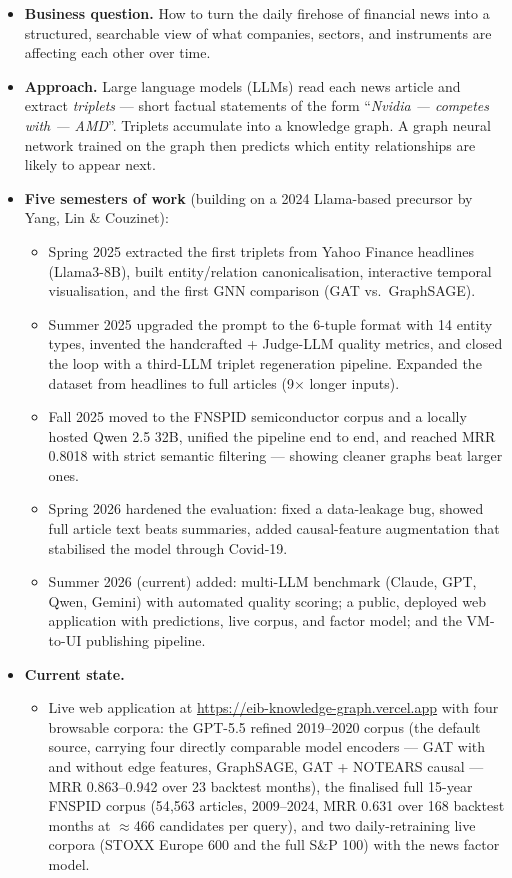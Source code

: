 \documentclass[11pt]{article}
\begin{document}
\begin{itemize}
  \item \textbf{Business question.} How to turn the daily firehose of financial news into a structured, searchable view of what companies, sectors, and instruments are affecting each other over time.
  \item \textbf{Approach.} Large language models (LLMs) read each news article and extract \emph{triplets} --- short factual statements of the form ``\textit{Nvidia --- competes with --- AMD}''. Triplets accumulate into a knowledge graph. A graph neural network trained on the graph then predicts which entity relationships are likely to appear next.
  \item \textbf{Five semesters of work} (building on a 2024 Llama-based precursor by Yang, Lin \& Couzinet):
    \begin{itemize}
      \item Spring 2025 extracted the first triplets from Yahoo Finance headlines (Llama3-8B), built entity/relation canonicalisation, interactive temporal visualisation, and the first GNN comparison (GAT vs.\ GraphSAGE).
      \item Summer 2025 upgraded the prompt to the 6-tuple format with 14 entity types, invented the handcrafted + Judge-LLM quality metrics, and closed the loop with a third-LLM triplet regeneration pipeline. Expanded the dataset from headlines to full articles (9\(\times\) longer inputs).
      \item Fall 2025 moved to the FNSPID semiconductor corpus and a locally hosted Qwen 2.5 32B, unified the pipeline end to end, and reached MRR 0.8018 with strict semantic filtering --- showing cleaner graphs beat larger ones.
      \item Spring 2026 hardened the evaluation: fixed a data-leakage bug, showed full article text beats summaries, added causal-feature augmentation that stabilised the model through Covid-19.
      \item Summer 2026 (current) added: multi-LLM benchmark (Claude, GPT, Qwen, Gemini) with automated quality scoring; a public, deployed web application with predictions, live corpus, and factor model; and the VM-to-UI publishing pipeline.
    \end{itemize}
  \item \textbf{Current state.}
    \begin{itemize}
      \item Live web application at \url{https://eib-knowledge-graph.vercel.app} with four browsable corpora: the GPT-5.5 refined 2019--2020 corpus (the default source, carrying four directly comparable model encoders --- GAT with and without edge features, GraphSAGE, GAT + NOTEARS causal --- MRR 0.863--0.942 over 23 backtest months), the finalised full 15-year FNSPID corpus (54{,}563 articles, 2009--2024, MRR 0.631 over 168 backtest months at \(\approx\)466 candidates per query), and two daily-retraining live corpora (STOXX Europe 600 and the full S\&P 100) with the news factor model.

\end{itemize}
\end{itemize}
\end{document}
